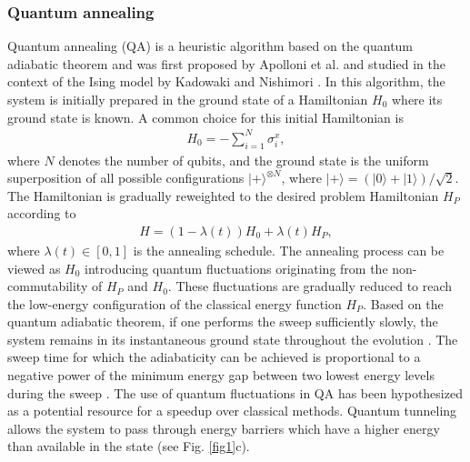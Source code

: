 \documentclass[fleqn,10pt]{wlscirep}
\def\change#1{#1}
\begin{document}
\subsubsection*{Quantum annealing}
Quantum annealing (QA) \cite{RevModPhys.90.015002,RevModPhys.80.1061,hauke2020perspectives} is a heuristic algorithm based on the quantum adiabatic theorem and was first proposed by Apolloni et al. \cite{apolloni1989quantum} \change{and studied in the context of the Ising model by Kadowaki and Nishimori \cite{PhysRevE.58.5355}.}  In this algorithm, the system is initially prepared in the ground state of a Hamiltonian $H_0$ where its ground state is known.  A common choice for this initial Hamiltonian is 
%
\begin{align}
H_{0}=-\sum_{i=1}^{N} \sigma_{i}^{x},
\label{simpleham}
\end{align}
%
where $N$ denotes the number of qubits, and the ground state is the uniform superposition of all possible configurations $|+\rangle^{\otimes N}$, \change{where $|+\rangle=(|0\rangle+|1\rangle)/\sqrt{2}$.} The Hamiltonian is  gradually reweighted to the desired problem Hamiltonian $H_P$ according to
%
\begin{align}
H =(1- \lambda (t)) H_0+ \lambda (t) H_P ,
\label{Isingham}
\end{align} 
%
where $\lambda (t) \in [0,1] $ is the annealing schedule. 
The annealing process can be viewed as $H_0$ introducing quantum fluctuations \change{originating from the non-commutability of  $H_P$ and $H_0$}.  These fluctuations are gradually reduced to reach the low-energy configuration of the classical energy function $H_P$. Based on the quantum adiabatic theorem, if one performs the sweep sufficiently slowly, the system remains in its instantaneous ground state throughout the evolution \cite{farhi2000quantum,RevModPhys.90.015002}.  The sweep time for which  the adiabaticity can be achieved is proportional to a negative power of the minimum energy gap between two lowest energy levels during the sweep \cite{roland2002quantum,amin2008effect,schaller2006general,lidar2009adiabatic}. The use of quantum fluctuations in QA has been hypothesized as a potential resource for a speedup over classical methods. Quantum tunneling allows the system to pass through energy barriers which have a higher energy than available in the state (see Fig. \ref{fig1}c). 
\end{document}
